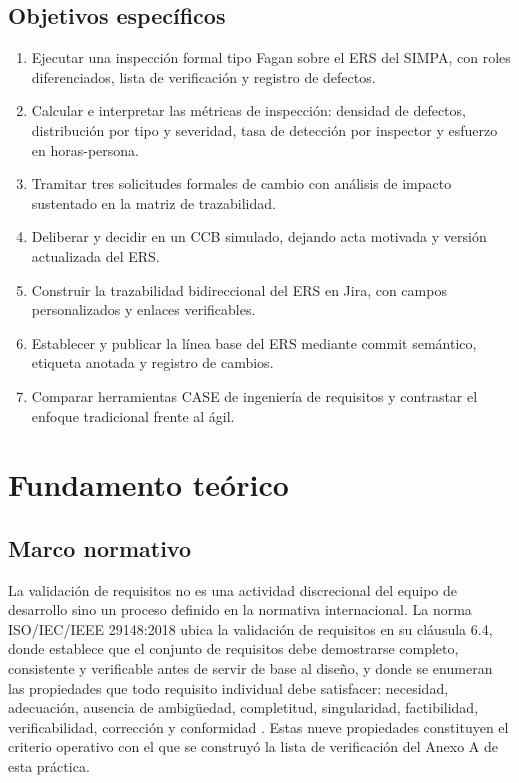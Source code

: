 \documentclass[11pt,letterpaper]{article}
\begin{document}
\subsection*{Objetivos específicos}

\begin{enumerate}[leftmargin=*]
  \item Ejecutar una inspección formal tipo Fagan sobre el ERS del SIMPA, con roles diferenciados,
        lista de verificación y registro de defectos.
  \item Calcular e interpretar las métricas de inspección: densidad de defectos, distribución por
        tipo y severidad, tasa de detección por inspector y esfuerzo en horas-persona.
  \item Tramitar tres solicitudes formales de cambio con análisis de impacto sustentado en la matriz
        de trazabilidad.
  \item Deliberar y decidir en un CCB simulado, dejando acta motivada y versión actualizada del ERS.
  \item Construir la trazabilidad bidireccional del ERS en Jira, con campos personalizados y enlaces
        verificables.
  \item Establecer y publicar la línea base del ERS mediante commit semántico, etiqueta anotada y
        registro de cambios.
  \item Comparar herramientas CASE de ingeniería de requisitos y contrastar el enfoque tradicional
        frente al ágil.
\end{enumerate}

\section{Fundamento teórico}

\subsection{Marco normativo}

La validación de requisitos no es una actividad discrecional del equipo de desarrollo sino un
proceso definido en la normativa internacional. La norma ISO/IEC/IEEE 29148:2018 ubica la validación
de requisitos en su cláusula 6.4, donde establece que el conjunto de requisitos debe demostrarse
completo, consistente y verificable antes de servir de base al diseño, y donde se enumeran las
propiedades que todo requisito individual debe satisfacer: necesidad, adecuación, ausencia de
ambigüedad, completitud, singularidad, factibilidad, verificabilidad, corrección y conformidad
\cite{iso29148}. Estas nueve propiedades constituyen el criterio operativo con el que se construyó
la lista de verificación del Anexo A de esta práctica.
\end{document}
